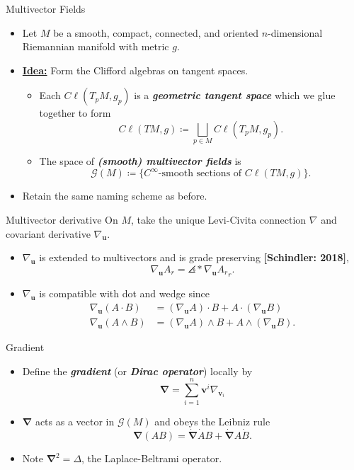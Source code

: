 \documentclass[aspectratio=169]{beamer}
\newcommand\boldgreen[1]{\textcolor{lighter_csu_green}{\emph{\textbf{#1}}}}
\newcommand\boldgold[1]{\textcolor{csu_gold}{\textbf{#1}}}
\newcommand{\grad}{\boldsymbol{\nabla}}
\newcommand{\G}{\mathcal{G}}
\newcommand{\blade}[1]{\boldsymbol{#1}}
\DeclarePairedDelimiter\angles{\langle}{\rangle}
\newcommand{\proj}[2]{\angles*{#2}_{#1}}
\begin{document}
\begin{frame}{Multivector Fields}
\vfill
\begin{itemize}
\pause
\item Let $M$ be a smooth, compact, connected, and oriented $n$-dimensional Riemannian manifold with metric $g$.
\pause
\item \noindent\textbf{\underline{Idea:}} Form the Clifford algebras on tangent spaces.
    \begin{itemize}
        \pause
        \item Each $C\ell(T_pM,g_p)$ is a \boldgreen{geometric tangent space} which we glue together to form
        \[
        C\ell(TM,g) \coloneqq \bigsqcup_{p\in M} C\ell(T_pM,g_p).
        \]
        \pause
        \item The space of \boldgreen{(smooth) multivector fields} is
        \[
        \G(M) \coloneqq \{\textrm{$C^\infty$-smooth sections of $C\ell(TM,g)$}\}.
        \]
    \end{itemize}
    \pause
    \item Retain the same naming scheme as before.
\end{itemize}
\vfill
\end{frame}

\begin{frame}{Multivector derivative}
\vfill
\pause
    On $M$, take the unique Levi-Civita connection $\nabla$ and covariant derivative $\nabla_{\blade{u}}$.
    \pause
    \begin{itemize}
        \item $\nabla_{\blade{u}}$ is extended to multivectors and is grade preserving \boldgold{[Schindler: 2018]},
        \[
        \nabla_{\blade{u}} A_r = \proj{r}{\nabla_{\blade{u}} A_r}.
        \]
        \pause
        \item $\nabla_{\blade{u}}$ is compatible with dot and wedge since
        \begin{align*}
        \nabla_{\blade{u}}(A\cdot B) &= (\nabla_{\blade{u}} A)\cdot B + A \cdot (\nabla_{\blade{u}} B)\\
        \nabla_{\blade{u}}(A\wedge B) &= (\nabla_{\blade{u}} A) \wedge B + A \wedge (\nabla_{\blade{u}} B).
        \end{align*}
    \end{itemize}
\vfill
\end{frame}

\begin{frame}{Gradient}
\vfill
\begin{itemize}
    \pause
    \item Define the \boldgreen{gradient} (or \boldgreen{Dirac operator}) locally by
    \[
    \grad = \sum_{i=1}^n \blade{v}^i \nabla_{\blade{v}_i}
    \]
    \pause
    \item $\grad$ acts as a vector in $\G(M)$ and obeys the Leibniz rule
    \[
    \grad(AB) = \dot{\grad}\dot{A}B + \dot{\grad}A\dot{B}.
    \]
    \pause
    \item Note $\grad^2=\Delta$, the Laplace-Beltrami operator.
\end{itemize}
\vfill
\end{frame}
\end{document}
